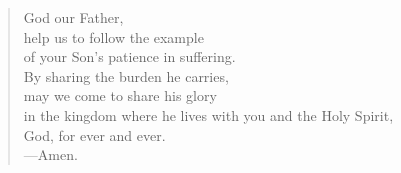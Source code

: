 \prayer

\setlength{\vleftmargin}{\prayerleftmargini}

\begin{verse}
God our Father,\\
help us to follow the example\\
of your Son’s patience in suffering.\\
By sharing the burden he carries,\\
may we come to share his glory\\
in the kingdom where he lives with you and the Holy Spirit,\\
God, for ever and ever.\\
{\color{red}---\thinspace}Amen.
\end{verse}

\setlength{\vleftmargin}{\defleftmargini}
